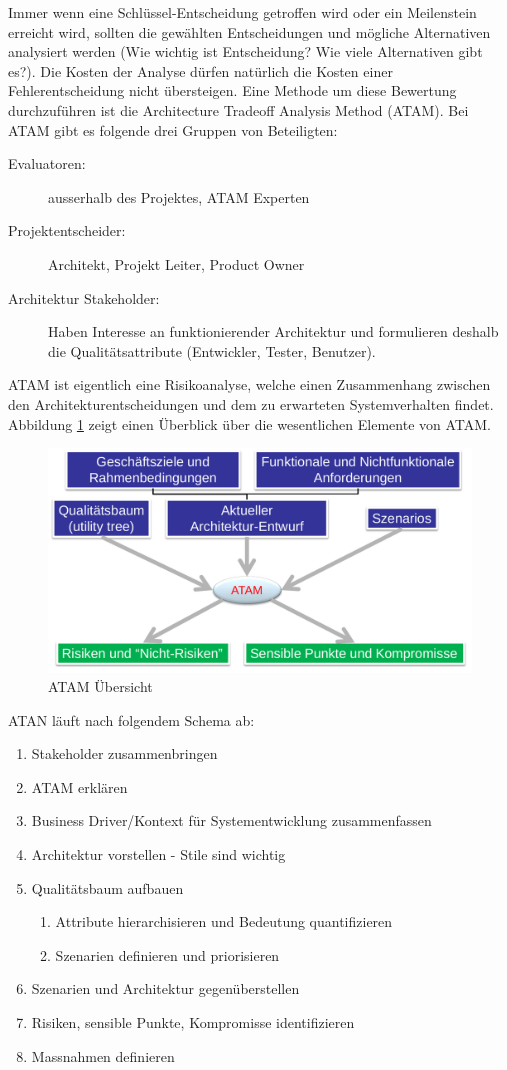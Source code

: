Immer wenn eine Schlüssel-Entscheidung getroffen wird oder ein Meilenstein erreicht wird, sollten die gewählten Entscheidungen und mögliche Alternativen analysiert werden (Wie wichtig ist Entscheidung? Wie viele Alternativen gibt es?). Die Kosten der Analyse dürfen natürlich die Kosten einer Fehlerentscheidung nicht übersteigen. Eine Methode um diese Bewertung durchzuführen ist die Architecture Tradeoff Analysis Method (ATAM). Bei ATAM gibt es folgende drei Gruppen von Beteiligten:
\begin{description}
	\item[Evaluatoren:] ausserhalb des Projektes, ATAM Experten
	\item[Projektentscheider:] Architekt, Projekt Leiter, Product Owner
	\item[Architektur Stakeholder:] Haben Interesse an funktionierender Architektur und formulieren deshalb die Qualitätsattribute (Entwickler, Tester, Benutzer).
\end{description}
ATAM ist eigentlich eine Risikoanalyse, welche einen Zusammenhang zwischen den Architekturentscheidungen und dem zu erwarteten Systemverhalten findet. Abbildung \ref{fig:atam} zeigt einen Überblick über die wesentlichen Elemente von ATAM.
\begin{figure}
\centering
\includegraphics[width=0.6\linewidth]{fig/atam}
\caption{ATAM Übersicht}
\label{fig:atam}
\end{figure}
ATAN läuft nach folgendem Schema ab:
\begin{enumerate}
	\item Stakeholder zusammenbringen
	\item ATAM erklären
	\item Business Driver/Kontext für Systementwicklung zusammenfassen
	\item Architektur vorstellen - Stile sind wichtig
	\item Qualitätsbaum aufbauen
	\begin{enumerate}
		\item Attribute hierarchisieren und Bedeutung quantifizieren
		\item Szenarien definieren und priorisieren
	\end{enumerate} 
	\item Szenarien und Architektur gegenüberstellen
	\item Risiken, sensible Punkte, Kompromisse identifizieren
	\item Massnahmen definieren
\end{enumerate}
